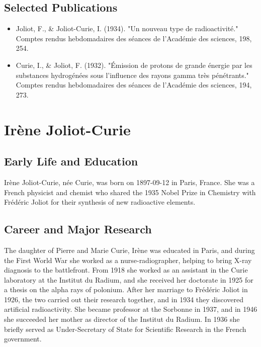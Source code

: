 \subsection*{Selected Publications}

\begin{itemize}

\item Joliot, F., \& Joliot-Curie, I. (1934). "Un nouveau type de radioactivité." Comptes rendus hebdomadaires des séances de l'Académie des sciences, 198, 254.

\item Curie, I., \& Joliot, F. (1932). "Émission de protons de grande énergie par les substances hydrogénées sous l'influence des rayons gamma très pénétrants." Comptes rendus hebdomadaires des séances de l'Académie des sciences, 194, 273.

\end{itemize}

\clearpage

\section{Irène Joliot-Curie}

\subsection*{Early Life and Education}

Irène Joliot-Curie, née Curie, was born on 1897-09-12 in Paris, France.
She was a French physicist and chemist who shared the 1935 Nobel Prize in Chemistry with Frédéric Joliot for their synthesis of new radioactive elements.

\subsection*{Career and Major Research}

The daughter of Pierre and Marie Curie, Irène was educated in Paris, and during the First World War she worked as a nurse-radiographer, helping to bring X-ray diagnosis to the battlefront.
From 1918 she worked as an assistant in the Curie laboratory at the Institut du Radium, and she received her doctorate in 1925 for a thesis on the alpha rays of polonium.
After her marriage to Frédéric Joliot in 1926, the two carried out their research together, and in 1934 they discovered artificial radioactivity.
She became professor at the Sorbonne in 1937, and in 1946 she succeeded her mother as director of the Institut du Radium.
In 1936 she briefly served as Under-Secretary of State for Scientific Research in the French government.

